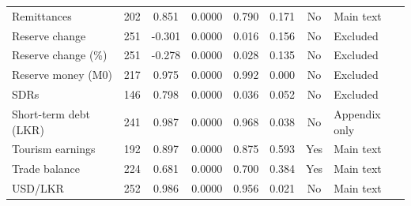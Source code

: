 \begin{longtable}{p{3.0cm}ccccccp{1.9cm}}
Remittances & 202 & 0.851 & 0.0000 & 0.790 & 0.171 & No & Main text \\
Reserve change & 251 & -0.301 & 0.0000 & 0.016 & 0.156 & No & Excluded \\
Reserve change (\%) & 251 & -0.278 & 0.0000 & 0.028 & 0.135 & No & Excluded \\
Reserve money (M0) & 217 & 0.975 & 0.0000 & 0.992 & 0.000 & No & Excluded \\
SDRs & 146 & 0.798 & 0.0000 & 0.036 & 0.052 & No & Excluded \\
Short-term debt (LKR) & 241 & 0.987 & 0.0000 & 0.968 & 0.038 & No & Appendix only \\
Tourism earnings & 192 & 0.897 & 0.0000 & 0.875 & 0.593 & Yes & Main text \\
Trade balance & 224 & 0.681 & 0.0000 & 0.700 & 0.384 & Yes & Main text \\
USD/LKR & 252 & 0.986 & 0.0000 & 0.956 & 0.021 & No & Main text \\
\end{longtable}